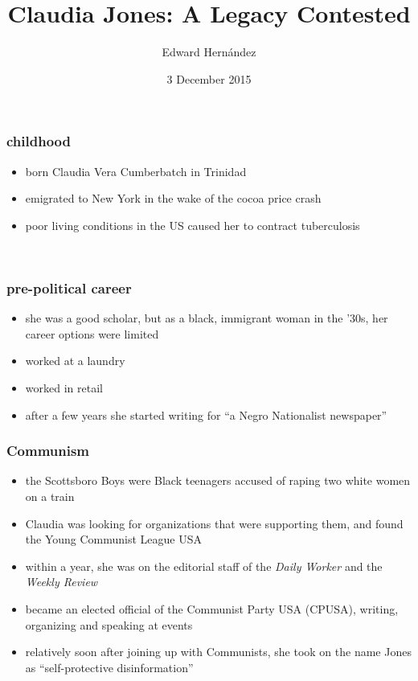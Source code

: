 \documentclass{beamer} %
\title{{C}laudia {J}ones: A Legacy Contested}
\author{Edward Hern\'{a}ndez}
\institute{}
\date{3 December 2015}
\theoremstyle{definition} %
\begin{document}
\begin{frame} 
\titlepage
\end{frame}

\begin{frame} 
	\frametitle{childhood}
	\begin{itemize}
		\item born Claudia Vera Cumberbatch in Trinidad
		\item emigrated to New York in the wake of the cocoa price crash
		\item poor living conditions in the US caused her to contract tuberculosis
	\end{itemize}

	\vfill
	\ \hfill \citep{Davies08}
\end{frame}

\begin{frame} 
	\frametitle{pre-political career}
	\begin{itemize}
		\item she was a good scholar, but as a black, immigrant woman in the '30s, her career options were limited
		\item worked at a laundry
		\item worked in retail
		\item after a few years she started writing for ``a Negro Nationalist newspaper'' \citep[ch.~2]{Davies08}
	\end{itemize}
\end{frame}

\begin{frame} 
	\frametitle{Communism}
	\begin{itemize}
		\item the Scottsboro Boys were Black teenagers accused of raping two white women on a train
		\item Claudia was looking for organizations that were supporting them, and found the Young Communist League USA
		\item within a year, she was on the editorial staff of the \emph{Daily Worker} and the \emph{Weekly Review}
		\item became an elected official of the Communist Party USA (CPUSA), writing, organizing and speaking at events
		\item relatively soon after joining up with Communists, she took on the name Jones as ``self-protective disinformation'' \citep{Taylor08P}
	\end{itemize}

	\vfill
	\ \hfill \citep{Davis15P}
\end{frame}
\end{document}
